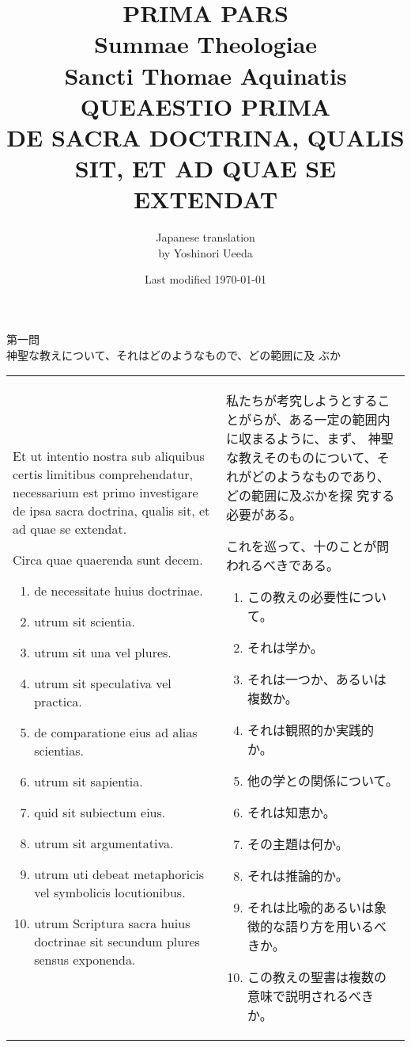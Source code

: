 \documentclass[10pt]{jsarticle} %
\title{{\bf PRIMA PARS}\\{\HUGE Summae Theologiae}\\Sancti Thomae
Aquinatis\\{\sffamily QUEAESTIO PRIMA}\\DE SACRA DOCTRINA, QUALIS SIT,
ET AD QUAE SE EXTENDAT}
\author{Japanese translation\\by Yoshinori {\sc Ueeda}}
\date{Last modified \today}
\begin{document}
\maketitle
\pagestyle{fancy}

\begin{center}
{\Large 第一問\\神聖な教えについて、それはどのようなもので、どの範囲に及
 ぶか}
\end{center}

\begin{longtable}{p{21em}p{21em}}

Et ut intentio nostra sub aliquibus certis limitibus comprehendatur,
 necessarium est primo investigare de ipsa sacra doctrina, qualis sit,
 et ad quae se extendat. 

Circa quae quaerenda sunt decem. 

\begin{enumerate}
 \item de necessitate huius doctrinae.
 \item utrum sit scientia.
 \item utrum sit una vel plures.
 \item utrum sit speculativa vel practica.
 \item de comparatione eius ad alias scientias.
 \item utrum sit sapientia.
 \item quid sit subiectum eius. 
 \item utrum sit argumentativa.
 \item utrum uti debeat metaphoricis vel symbolicis locutionibus.
 \item utrum Scriptura sacra huius doctrinae sit secundum plures sensus exponenda.

\end{enumerate}

&

私たちが考究しようとすることがらが、ある一定の範囲内に収まるように、まず、
 神聖な教えそのものについて、それがどのようなものであり、どの範囲に及ぶかを探
 究する必要がある。

これを巡って、十のことが問われるべきである。

\begin{enumerate}
 \item この教えの必要性について。
 \item それは学か。
 \item それは一つか、あるいは複数か。
 \item それは観照的か実践的か。
 \item 他の学との関係について。
 \item それは知恵か。
 \item その主題は何か。
 \item それは推論的か。
 \item それは比喩的あるいは象徴的な語り方を用いるべきか。
 \item この教えの聖書は複数の意味で説明されるべきか。
\end{enumerate}

\\

\end{longtable}
\end{document}
